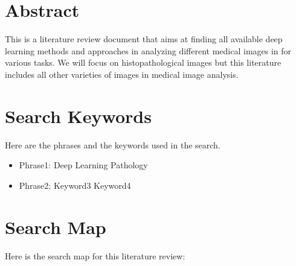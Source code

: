 \section{Abstract}

This is a literature review document that aims at finding all available deep learning methods and approaches in analyzing different medical images in for various tasks. We will focus on histopathological images but this literature includes all other varieties of images in medical image analysis. 

\clearpage
\section{Search Keywords}

Here are the phrases and the keywords used in the search.

\begin{itemize}
	\item Phrase1: Deep Learning Pathology
	\item Phrase2: Keyword3 Keyword4
\end{itemize}

\clearpage
\section{Search Map}

Here is the search map for this literature review:

